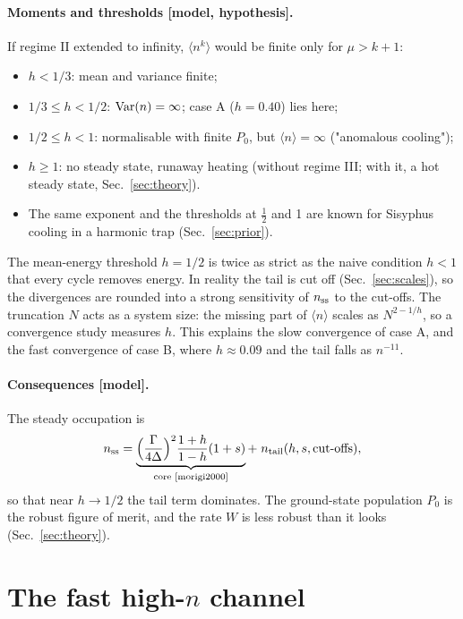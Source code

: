 \documentclass[11pt,a4paper]{article}
\begin{document}
\paragraph{Moments and thresholds [model, hypothesis].} If regime II extended to infinity, $\langle n^k\rangle$ would be finite only for $\mu>k+1$:
\begin{itemize}
\item $h<1/3$: mean and variance finite;
\item $1/3\le h<1/2$: ${\rm Var}(n)=\infty$; case A ($h=0.40$) lies here;
\item $1/2\le h<1$: normalisable with finite $P_0$, but $\langle n\rangle=\infty$ ("anomalous cooling");
\item $h\ge1$: no steady state, runaway heating (without regime III; with it, a hot steady state, Sec.~\ref{sec:theory}).
\item[] The same exponent and the thresholds at $\tfrac12$ and 1 are known for Sisyphus cooling in a harmonic trap (Sec.~\ref{sec:prior}).
\end{itemize}
The mean-energy threshold $h=1/2$ is twice as strict as the naive condition $h<1$ that every cycle removes energy. In reality the tail is cut off (Sec.~\ref{sec:scales}), so the divergences are rounded into a strong sensitivity of $n_{\rm ss}$ to the cut-offs. The truncation $N$ acts as a system size: the missing part of $\langle n\rangle$ scales as $N^{2-1/h}$, so a convergence study measures $h$. This explains the slow convergence of case A, and the fast convergence of case B, where $h\approx0.09$ and the tail falls as $n^{-11}$.

\paragraph{Consequences [model].} The steady occupation is
\begin{equation}
  n_{\rm ss}=\underbrace{\Big(\frac{\Gamma}{4\Delta}\Big)^2\frac{1+h}{1-h}(1+s)}_{\text{core~\cite{morigi2000}}}+\;n_{\rm tail}(h,s,\text{cut-offs}),
\end{equation}
so that near $h\to1/2$ the tail term dominates. The ground-state population $P_0$ is the robust figure of merit, and the rate $W$ is less robust than it looks (Sec.~\ref{sec:theory}).

\section{The fast high-$n$ channel}
\label{sec:sisyphus}
\end{document}
